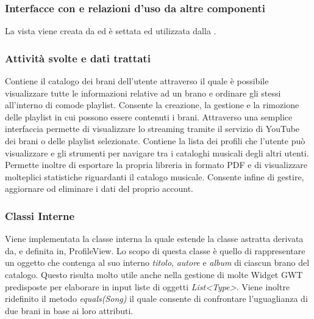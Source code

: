\subsubsection*{Interfacce con e relazioni d'uso da altre componenti}
 La vista viene creata da  ed \`e settata ed utilizzata dalla
 .
 \subsubsection*{Attivit\`a svolte e dati trattati}
Contiene il catalogo dei brani dell'utente attraverso il quale \`e possibile
visualizzare tutte le informazioni relative ad un brano e ordinare gli stessi
all'interno di comode playlist. Consente la creazione, la gestione e la
rimozione delle playlist in cui possono essere contenuti i brani. Attraverso una semplice
interfaccia permette di visualizzare lo streaming tramite il servizio di YouTube
dei brani o delle playlist selezionate. Contiene la lista dei profili che
l'utente pu\`o visualizzare e gli strumenti per navigare tra i cataloghi
musicali degli altri utenti. Permette inoltre di esportare la propria libreria
in formato PDF e di visualizzare molteplici statistiche riguardanti il catalogo
musicale. Consente infine di gestire, aggiornare od eliminare i dati del proprio
account.
\subsubsection*{Classi Interne} Viene implementata la classe interna  la quale estende la classe astratta  derivata da, e definita in, ProfileView. Lo scopo di questa classe \`e quello di rappresentare un oggetto che contenga al suo interno \emph{titolo}, \emph{autore} e \emph{album} di ciascun brano del catalogo. Questo risulta molto utile anche nella gestione di molte Widget GWT predisposte per elaborare in input liste di oggetti \emph{List\textless Type\textgreater}. Viene inoltre ridefinito il metodo \emph{equals(Song)} il quale consente di confrontare l'uguaglianza di due brani in base ai loro attributi.
